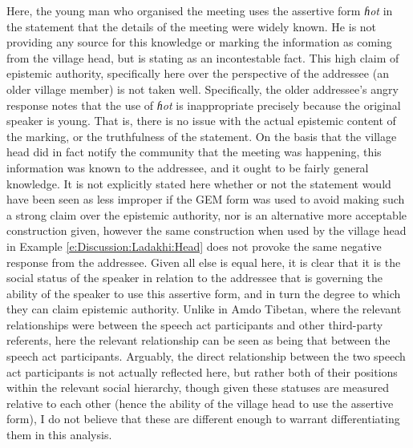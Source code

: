 Here, the young man who organised the meeting uses the assertive form \textit{ɦot} in the statement that the details of the meeting were widely known. He is not providing any source for this knowledge or marking the information as coming from the village head, but is stating as an incontestable fact. This high claim of epistemic authority, specifically here over the perspective of the addressee (an older village member) is not taken well. Specifically, the older addressee's angry response notes that the use of \textit{ɦot} is inappropriate precisely because the original speaker is young. That is, there is no issue with the actual epistemic content of the marking, or the truthfulness of the statement. On the basis that the village head did in fact notify the community that the meeting was happening, this information was known to the addressee, and it ought to be fairly general knowledge. It is not explicitly stated here whether or not the statement would have been seen as less improper if the GEM form was used to avoid making such a strong claim over the epistemic authority, nor is an alternative more acceptable construction given, however the same construction when used by the village head in Example \ref{e:Discussion:Ladakhi:Head} does not provoke the same negative response from the addressee. Given all else is equal here, it is clear that it is the social status of the speaker in relation to the addressee that is governing the ability of the speaker to use this assertive form, and in turn the degree to which they can claim epistemic authority. Unlike in Amdo Tibetan, where the relevant relationships were between the speech act participants and other third-party referents, here the relevant relationship can be seen as being that between the speech act participants. Arguably, the direct relationship between the two speech act participants is not actually reflected here, but rather both of their positions within the relevant social hierarchy, though given these statuses are measured relative to each other (hence the ability of the village head to use the assertive form), I do not believe that these are different enough to warrant differentiating them in this analysis.

